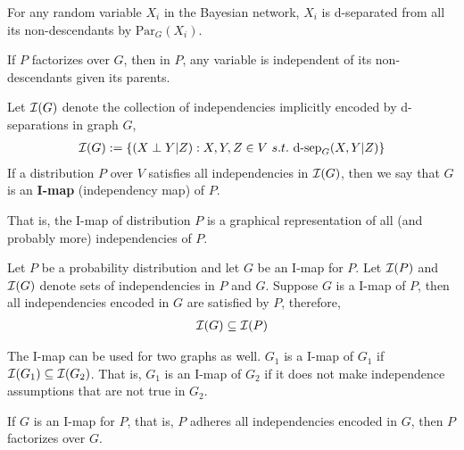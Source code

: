 \documentclass[11pt]{article}
\newcommand{\dsep}[0]{\text{d-sep}}
\newcommand{\pa}[0]{\text{Par}}
\begin{document}
	\begin{theorem}
		For any random variable $X_i$ in the Bayesian network, $X_i$ is d-separated from all its non-descendants by $\pa_G(X_i)$.
	\end{theorem}
	
	\begin{corollary}
		If $P$ factorizes over $G$, then in $P$, any variable is independent of its non-descendants given its parents.
	\end{corollary}
	
	\begin{definition}
		Let $\mathcal{{I}}(G)$ denote the collection of independencies implicitly encoded by d-separations in graph $G$,
		\begin{align}
			\mc{I}(G) := \{(X\perp Y|Z): X, Y, Z \in V\ s.t.\ \dsep_G (X, Y | Z)\}
		\end{align}
		If a distribution $P$ over $V$ satisfies all independencies in $\mathcal{{I}}(G)$, then we say that $G$ is an \textbf{I-map} (independency map) of $P$.
		
		That is, the I-map of distribution $P$ is a graphical representation of all (and probably more) independencies of $P$.
	\end{definition}
	
	\begin{example}
		Let $P$ be a probability distribution and let $G$ be an I-map for $P$. Let $\mathcal{{I}}(P)$ and $\mathcal{{I}}(G)$ denote sets of independencies in $P$ and $G$.
		Suppose $G$ is a I-map of $P$, then all independencies encoded in $G$ are satisfied by $P$, therefore,
		\begin{align}
			\mathcal{{I}}(G) \subseteq \mathcal{{I}}(P)
		\end{align}
	\end{example}
	
	\begin{example}
		The I-map can be used for two graphs as well. $G_1$ is a I-map of $G_1$ if $\mathcal{{I}}(G_1) \subseteq \mathcal{{I}}(G_2)$.
		That is, $G_1$ is an I-map of $G_2$ if it does not make independence assumptions that are not true in $G_2$.
	\end{example}
	
	\begin{theorem}
		If $G$ is an I-map for $P$, that is, $P$ adheres all independencies encoded in $G$, then $P$ factorizes over $G$.
%			
	\end{theorem}
\end{document}
